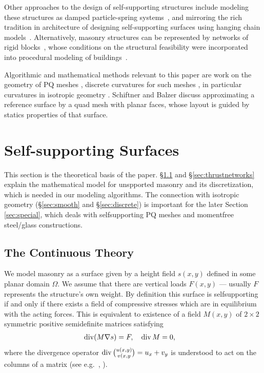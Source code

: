 \documentclass[review]{acmsiggraph}
\def\Div{\mathop{{\rm div}}\nolimits}
\begin{document}
Other approaches to the design of self-supporting structures
include modeling these structures as damped particle-spring
systems~\cite{Kilian2005,barnes09}, and mirroring the rich tradition in
architecture of designing self-supporting surfaces using hanging chain
models~\cite{Heyman98}. Alternatively, masonry structures can be
represented by networks of rigid blocks~\cite{Livesley92}, whose conditions
on the structural feasibility were incorporated into procedural modeling
of buildings~\cite{Whiting09}.

Algorithmic and mathematical methods relevant to this paper are work on
the geometry of PQ meshes \cite{Liu2006},
discrete curvatures for such meshes \cite{Pottmann2007b,bobenko-2010-ct},
in particular curvatures in isotropic geometry \cite{Pottmann2007}.
Schiftner and Balzer  discuss approximating a
reference surface by a quad mesh with planar faces, whose layout is guided
by statics properties of that surface.


\section{Self-supporting Surfaces}

This section is the theoretical basis of the paper. \S\ref{ssec:cont}
and \S\ref{sec:thrustnetworks} explain the mathematical
model for unspported masonry and its discretization, which is needed in our
modeling algorithms. The connection
with isotropic geometry (\S\ref{sec:smooth} and \S\ref{sec:discrete})
is important for the later Section \ref{sec:special},
which deals with self\dash supporting PQ meshes and
moment\dash free steel\slash glass constructions.

\subsection{The Continuous Theory}
\label{ssec:cont}

We model masonry as a surface given by a height field $s(x,y)$
defined in some planar domain $\Omega$. We assume that there are vertical
loads $F(x,y)$ --- usually $F$ represents the structure's own weight. By
definition this surface is self\dash supporting if and only if there
exists a field of compressive stresses which are in equilibrium with the
acting forces. This is equivalent to existence of a field $M(x,y)$ of
$2\times 2$ symmetric positive semidefinite matrices satisfying
	\begin{align}
	\Div (M\nabla s) = F, \quad
	\Div M &= 0,
	  \label{eq:conds}
	\end{align}
 where the divergence operator $\Div{u(x,y)\choose v(x,y}= u_x + v_y$ is
understood to act on the columns of a matrix (see e.g.\
\cite{Fraternali2010}, \cite{Giaquinta1985}).
\end{document}
